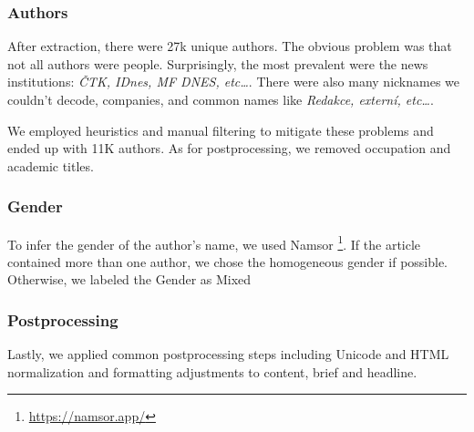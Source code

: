 \subsubsection{Authors}
\label{sec:authors}
After extraction, there were 27k unique authors.
The obvious problem was that not all authors were people.
Surprisingly, the most prevalent were the news institutions: \textit{ČTK, IDnes, MF DNES, etc\dots}.
There were also many nicknames we couldn't decode, companies,
and common names like \textit{Redakce, externí, etc\dots}.

We employed heuristics and manual filtering
to mitigate these problems and ended up with 11K authors.
As for postprocessing, we removed occupation and academic titles.

\subsubsection{Gender}
\label{sec:gender}
To infer the gender of the author's name, we used Namsor \footnote{\url{https://namsor.app/}}.
If the article contained more than one author, we chose the homogeneous gender if
possible. Otherwise, we labeled the Gender as Mixed

\subsubsection{Postprocessing}
Lastly, we applied common postprocessing steps including Unicode and HTML normalization and formatting adjustments
to content, brief and headline.


